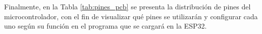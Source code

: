 
    
\noindent
Finalmente, en la Tabla \ref{tab:pines_pcb} se presenta la distribución de pines del microcontrolador, con el fin de visualizar qué pines se utilizarán y configurar cada uno según su función en el programa que se cargará en la ESP32.

